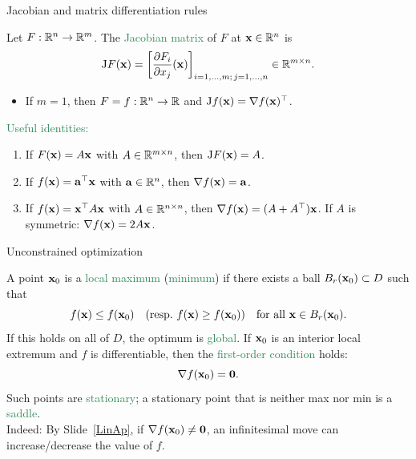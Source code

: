 \documentclass[11pt,aspectratio=169]{beamer}
\begin{document}
\begin{frame}{Jacobian and matrix differentiation rules}

Let \(F:\mathbb R^n \to \mathbb R^m\).  
The \textcolor{SeaGreen}{Jacobian matrix} of \(F\) at \({\bf x}\in\mathbb R^n\) is
\[
{\rm J}F({\bf x}) = 
\left[\frac{\partial F_i}{\partial x_j}({\bf x})\right]_{i=1,\dots,m;\,j=1,\dots,n}
\in \mathbb R^{m\times n}.
\]

\begin{itemize}
\item If \(m=1\), then \(F=f:\mathbb R^n \to \mathbb R\) and  
\({\rm J}f({\bf x}) = \nabla f({\bf x})^{\top}\).
\end{itemize}

\vskip 8pt
\textcolor{SeaGreen}{Useful identities:}
\begin{enumerate}
\item If \(F({\bf x})=A{\bf x}\) with \(A\in\mathbb R^{m\times n}\), then \({\rm J}F({\bf x}) = A\).
\item If \(f({\bf x})={\bf a}^{\top}{\bf x}\) with \({\bf a}\in\mathbb R^n\), then \(\nabla f({\bf x})={\bf a}\).
\item If \(f({\bf x})={\bf x}^{\top}A{\bf x}\) with \(A\in\mathbb R^{n\times n}\), then  
\(\nabla f({\bf x})=(A+A^{\top}){\bf x}\).  
If \(A\) is symmetric: \(\nabla f({\bf x})=2A{\bf x}\).
\end{enumerate}

\end{frame}
\begin{frame}{Unconstrained optimization}

A point \({\bf x}_0\) is a \textcolor{SeaGreen}{local maximum} (\textcolor{SeaGreen}{minimum}) if there exists a ball \(B_r({\bf x}_0)\subset D\) such that
\[
f({\bf x})\le f({\bf x}_0)\quad (\text{resp.\ } f({\bf x})\ge f({\bf x}_0))
\quad\text{for all }{\bf x}\in B_r({\bf x}_0).
\]
If this holds on all of \(D\), the optimum is \textcolor{SeaGreen}{global}.
\vskip 6pt
If \({\bf x}_0\) is an interior local extremum and \(f\) is differentiable, then the \textcolor{SeaGreen}{first-order condition} holds:
\[
\nabla f({\bf x}_0)={\bf 0}.
\]
Such points are \textcolor{SeaGreen}{stationary}; a stationary point that is neither max nor min is a \textcolor{SeaGreen}{saddle}.\\[4mm]

Indeed: By Slide~\ref{LinAp}, if $\nabla f({\bf x}_0)\neq {\bf 0}$, an infinitesimal move can increase/decrease the value of $f$.
\end{frame}
\end{document}
